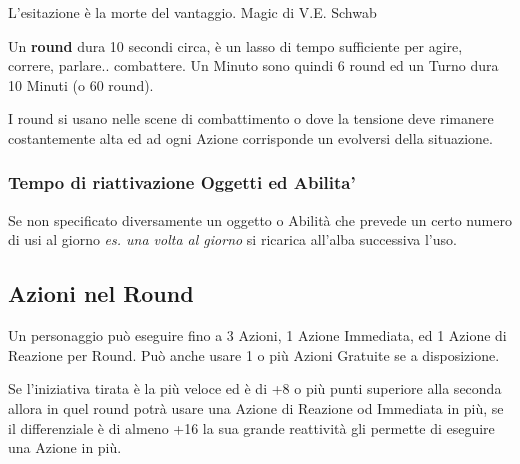 \begin{multicols}{2}
\begin{enfasi}{L'esitazione è la morte del vantaggio. Magic di V.E. Schwab} \end{enfasi}

Un \textbf{round} dura 10 secondi circa, è un lasso di tempo sufficiente per agire, correre, parlare.. combattere. Un Minuto sono quindi 6 round ed un Turno dura 10 Minuti (o 60 round).

I round si usano nelle scene di combattimento o dove la tensione deve rimanere costantemente alta ed ad ogni Azione corrisponde un evolversi della situazione.

\subsubsection{Tempo di riattivazione Oggetti ed Abilita'}\label{temporiattivazioneoggetti}

Se non specificato diversamente un oggetto o Abilità che prevede un certo numero di usi al giorno \emph{es. una volta al giorno} si ricarica all'alba successiva l'uso.



\subsection{Azioni nel Round}\label{azioninelround}


Un personaggio può eseguire fino a 3 Azioni, 1 Azione Immediata, ed 1 Azione di Reazione per Round. Può anche usare 1 o più Azioni Gratuite se a disposizione.

Se l'iniziativa tirata è la più veloce ed è di +8 o più punti superiore alla seconda allora in quel round potrà usare una Azione di Reazione od Immediata in più, se il differenziale è di almeno +16 la sua grande reattività gli permette di eseguire una Azione in più.


\end{multicols}
